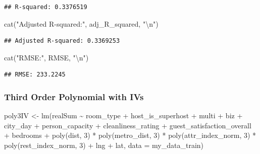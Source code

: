 \documentclass[
]{article}
\newenvironment{Shaded}{\begin{snugshade}}{\end{snugshade}}
\newcommand{\AttributeTok}[1]{\textcolor[rgb]{0.77,0.63,0.00}{#1}}
\newcommand{\DecValTok}[1]{\textcolor[rgb]{0.00,0.00,0.81}{#1}}
\newcommand{\FunctionTok}[1]{\textcolor[rgb]{0.00,0.00,0.00}{#1}}
\newcommand{\NormalTok}[1]{#1}
\newcommand{\OtherTok}[1]{\textcolor[rgb]{0.56,0.35,0.01}{#1}}
\newcommand{\SpecialCharTok}[1]{\textcolor[rgb]{0.00,0.00,0.00}{#1}}
\newcommand{\StringTok}[1]{\textcolor[rgb]{0.31,0.60,0.02}{#1}}
\begin{document}
\begin{verbatim}
## R-squared: 0.3376519
\end{verbatim}

\begin{Shaded}
\begin{Highlighting}[]
\FunctionTok{cat}\NormalTok{(}\StringTok{"Adjusted R{-}squared:"}\NormalTok{, adj\_R\_squared, }\StringTok{"}\SpecialCharTok{\textbackslash{}n}\StringTok{"}\NormalTok{)}
\end{Highlighting}
\end{Shaded}

\begin{verbatim}
## Adjusted R-squared: 0.3369253
\end{verbatim}

\begin{Shaded}
\begin{Highlighting}[]
\FunctionTok{cat}\NormalTok{(}\StringTok{"RMSE:"}\NormalTok{, RMSE, }\StringTok{"}\SpecialCharTok{\textbackslash{}n}\StringTok{"}\NormalTok{)}
\end{Highlighting}
\end{Shaded}

\begin{verbatim}
## RMSE: 233.2245
\end{verbatim}

\hypertarget{third-order-polynomial-with-ivs}{%
\subsubsection{Third Order Polynomial with
IVs}\label{third-order-polynomial-with-ivs}}

\begin{Shaded}
\begin{Highlighting}[]
\NormalTok{poly3IV }\OtherTok{\textless{}{-}} \FunctionTok{lm}\NormalTok{(realSum }\SpecialCharTok{\textasciitilde{}}\NormalTok{ room\_type }\SpecialCharTok{+}\NormalTok{ host\_is\_superhost }\SpecialCharTok{+}\NormalTok{ multi }\SpecialCharTok{+}
\NormalTok{    biz }\SpecialCharTok{+}\NormalTok{ city\_day }\SpecialCharTok{+}\NormalTok{ person\_capacity }\SpecialCharTok{+}\NormalTok{ cleanliness\_rating }\SpecialCharTok{+}\NormalTok{ guest\_satisfaction\_overall }\SpecialCharTok{+}
\NormalTok{    bedrooms }\SpecialCharTok{+} \FunctionTok{poly}\NormalTok{(dist, }\DecValTok{3}\NormalTok{) }\SpecialCharTok{*} \FunctionTok{poly}\NormalTok{(metro\_dist, }\DecValTok{3}\NormalTok{) }\SpecialCharTok{*} \FunctionTok{poly}\NormalTok{(attr\_index\_norm,}
    \DecValTok{3}\NormalTok{) }\SpecialCharTok{*} \FunctionTok{poly}\NormalTok{(rest\_index\_norm, }\DecValTok{3}\NormalTok{) }\SpecialCharTok{+}\NormalTok{ lng }\SpecialCharTok{+}\NormalTok{ lat, }\AttributeTok{data =}\NormalTok{ my\_data\_train)}
\end{Highlighting}
\end{Shaded}
\end{document}
